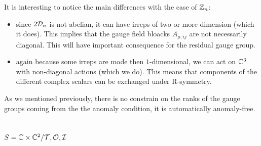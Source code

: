         It is interesting to notice the main differences with the case of $\mathbb{Z}_n$:
        \begin{itemize}
            \item since $2\mathcal{D}_n$ is not abelian, it can have irreps of two or more dimension (which it does). This implies that the gauge field bloacks $A_{\mu;ij}$ are not necessarily diagonal. This will have important consequence for the residual gauge group.
            \item again because some irreps are mode then $1$-dimensional, we can act on $\mathbb{C}^3$ with non-diagonal actions (which we do). This means that components of the different complex scalars can be exchanged under R-symmetry.
        \end{itemize}


        As we mentioned previously, there is no constrain on the ranks of the gauge groups coming from the the anomaly condition, it is automatically anomaly-free.

    \subsection{$S=\mathbb{C}\times\mathbb{C}^2/\mathcal{T},\mathcal{O},\mathcal{I}$}

